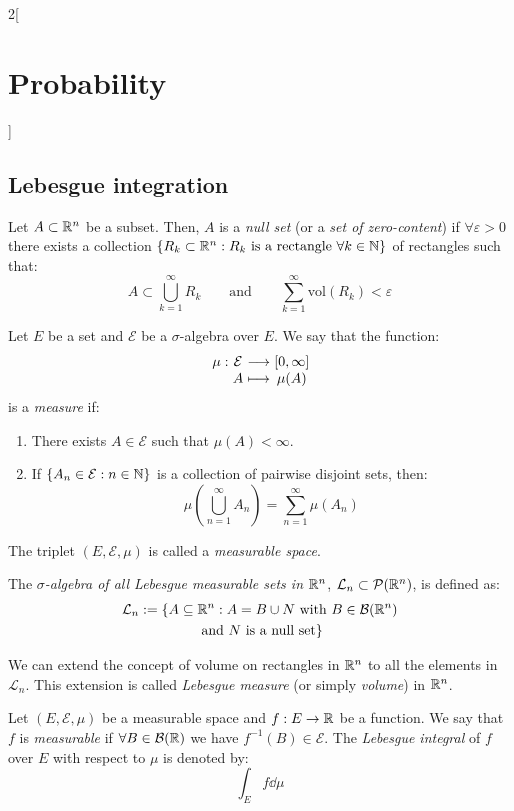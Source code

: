 \documentclass[../../../main.tex]{subfiles}
\begin{document}
\begin{multicols}{2}[\section{Probability}]
  \subsection{Lebesgue integration}
  \begin{definition}
    Let $A\subset\mathbb{R}^n$ be a subset. Then, $A$ is a \textit{null set} (or a \textit{set of zero-content}) if $\forall \varepsilon>0$ there exists a collection $\{R_k\subset\mathbb{R}^n:R_k\text{ is a rectangle }\forall k\in\mathbb{N}\}$ of rectangles such that:
    $$A\subset\bigcup_{k=1}^\infty R_k\qquad\text{and}\qquad\sum_{k=1}^\infty\text{vol}(R_k)<\varepsilon$$
  \end{definition}
  \begin{definition}
    Let $E$ be a set and $\mathcal{E}$ be a $\sigma$-algebra over $E$. We say that the function:
    $$
      \function{\mu}{\mathcal{E}}{[0,\infty]}{A}{\mu(A)}
    $$
    is a \textit{measure} if:
    \begin{enumerate}
      \item There exists $A\in\mathcal{E}$ such that $\mu(A)<\infty$.
      \item If $\{A_n\in\mathcal{E}:n\in\mathbb{N}\}$ is a collection of pairwise disjoint sets, then: $$\mu\left(\bigcup_{n=1}^\infty A_n\right)=\sum_{n=1}^\infty \mu(A_n)$$
    \end{enumerate}
    The triplet $(E,\mathcal{E},\mu)$ is called a \textit{measurable space}.
  \end{definition}
  \begin{definition}
    The \textit{$\sigma$-algebra of all Lebesgue measurable sets in $\mathbb{R}^n$}, $\mathcal{L}_n\subset\mathcal{P}(\mathbb{R}^n)$, is defined as:
    \begin{multline*}
      \mathcal{L}_n:=\{A\subseteq\mathbb{R}^n:A=B\cup N\text{ with }B\in\mathcal{B}(\mathbb{R}^n)\\\text{ and $N$ is a null set}\}
    \end{multline*}
  \end{definition}
  \begin{theorem}
    We can extend the concept of volume on rectangles in $\mathbb{R}^n$ to all the elements in $\mathcal{L}_n$. This extension is called \textit{Lebesgue measure} (or simply \textit{volume}) in $\mathbb{R}^n$.
  \end{theorem}
  \begin{definition}
    Let $(E,\mathcal{E},\mu)$ be a measurable space and $f:E\rightarrow\mathbb{R}$ be a function. We say that $f$ is \textit{measurable} if $\forall B\in\mathcal{B}(\mathbb{R})$ we have $f^{-1}(B)\in\mathcal{E}$. The \textit{Lebesgue integral} of $f$ over $E$ with respect to $\mu$ is denoted by: $$\int_Ef\dd\mu$$

\end{definition}
\end{multicols}
\end{document}
